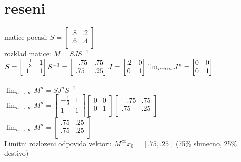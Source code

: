 \documentclass[a4paper]{article}
\def\doubleunderline#1{\underline{\underline{#1}}}
\begin{document}
\section*{reseni}
matice pocasi: $
S=
\begin{bmatrix}
	.8 & .2\\
	.6 & .4\\
\end{bmatrix}
$\\
rozklad matice: $M=SJS^{-1}$\\
$
S=
\begin{bmatrix}
	-\frac{1}{3} & 1\\
	1 & 1\\
\end{bmatrix}\\
S^{-1}=
\begin{bmatrix}
	-.75 & .75\\
	.75 & .25\\
\end{bmatrix}\\
J=
\begin{bmatrix}
	.2 & 0\\
	0 & 1\\
\end{bmatrix}\\
\lim_{n\rightarrow\infty}J^n=
\begin{bmatrix}
	0 & 0\\
	0 & 1\\
\end{bmatrix}\\
$\\
\\
$ \lim_{n\rightarrow\infty}M^n=SJ^nS^{-1}$\\
$ \lim_{n\rightarrow\infty}M^n=
\begin{bmatrix}
	-\frac{1}{3} & 1\\
	1 & 1\\
\end{bmatrix}
\begin{bmatrix}
	0 & 0\\
	0 & 1\\
\end{bmatrix}
\begin{bmatrix}
	-.75 & .75\\
	.75 & .25\\
\end{bmatrix}
$\\
$ \lim_{n\rightarrow\infty}M^n=
\begin{bmatrix}
	.75 & .25\\
	.75 & .25\\
\end{bmatrix}
$\\
\doubleunderline{Limitni rozlozeni odpovida vektoru $M^{\infty}x_0 = [.75,.25]$}
(75\% slunecno, 25\% destivo)
\end{document}
